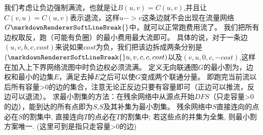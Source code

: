 {}
\markdownRendererSectionEnd \markdownRendererSectionBegin
{}\markdownRendererInterblockSeparator
{}我们考虑让负边强制满流，也就是让$ B(u,v)=C(u,v) $,并且让$ C(v,u)=C(u,v) $表示退流，这样$ u->v $这条边就不会出现在流量网络$ G\markdownRendererSoftLineBreak
{}$中，就可以正常跑费用流了。\markdownRendererInterblockSeparator
{}\markdownRendererInterblockSeparator
{}
\markdownRendererSectionEnd \markdownRendererSectionBegin
{}\markdownRendererInterblockSeparator
{}我们把所有边权取反，跑（可能有负圈）的最小费用最大流即可。\markdownRendererParagraphSeparator
{}具体的说，对于一条边$ (u,v,b,c,cost) $来说如果$ cost $为负，我们把该边拆成两条分别是$ (\markdownRendererSoftLineBreak
{}u,v,c,c,cost) $以及$ (v,u,0,c,-cost) $,这样在加入上下界网络流图中时负边权必须流满。\markdownRendererInterblockSeparator
{}
\markdownRendererSectionEnd 
\markdownRendererSectionEnd \markdownRendererSectionBegin
{}\markdownRendererInterblockSeparator
{}定义无向联通图$ G $的最小割为，边权和最小的边集$ E $，满足去掉$ E $之后可以使$ G $变成两个联通分量。\markdownRendererInterblockSeparator
{}\markdownRendererInterblockSeparator
{}
\markdownRendererSectionEnd \markdownRendererSectionBegin
{}\markdownRendererInterblockSeparator
{}\markdownRendererSectionBegin
\markdownRendererSectionBegin
{}\markdownRendererInterblockSeparator
{}即跑完当前流以后所有容量>0的边的集合，注意无论正反边只要有容量即可（正边可以推流，反边可以退流）。\markdownRendererInterblockSeparator
{}
\markdownRendererSectionEnd \markdownRendererSectionBegin
{}\markdownRendererInterblockSeparator
{}求最小割集的方法：在残余网络中从源点开始$ DFS $（只走容量>0的边），能到达的所有点即为$ S $,$ S $及其补集为最小割集。\markdownRendererInterblockSeparator
{}
\markdownRendererSectionEnd \markdownRendererSectionBegin
{}\markdownRendererInterblockSeparator
{}残余网络中$ S $直接连向的点必在$ S $的割集中, 直接连向$ T $的点必在$ T $的割集中; 若这些点的并集为全集, 则最小割方案唯一.\markdownRendererParagraphSeparator
{}(这里可到是指只走容量>0的边)\markdownRendererInterblockSeparator
{}
\markdownRendererSectionEnd \markdownRendererSectionBegin
{}\markdownRendererInterblockSeparator
